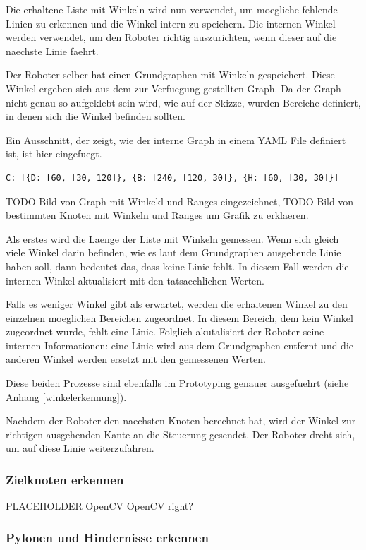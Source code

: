 Die erhaltene Liste mit Winkeln wird nun verwendet, um moegliche fehlende Linien zu erkennen und die Winkel intern zu speichern. Die internen Winkel werden verwendet, um den Roboter richtig auszurichten, wenn dieser auf die naechste Linie faehrt.

Der Roboter selber hat einen Grundgraphen mit Winkeln gespeichert. Diese Winkel ergeben sich aus dem zur Verfuegung gestellten Graph.
Da der Graph nicht genau so aufgeklebt sein wird, wie auf der Skizze, wurden Bereiche definiert, in denen sich die Winkel befinden sollten.

Ein Ausschnitt, der zeigt, wie der interne Graph in einem YAML File definiert ist, ist hier eingefuegt.

\begin{verbatim}
C: [{D: [60, [30, 120]}, {B: [240, [120, 30]}, {H: [60, [30, 30]}]
\end{verbatim}

TODO Bild von Graph mit Winkekl und Ranges eingezeichnet, TODO Bild von bestimmten Knoten mit Winkeln und Ranges um Grafik zu erklaeren.

Als erstes wird die Laenge der Liste mit Winkeln gemessen. Wenn sich gleich viele Winkel darin befinden, wie es laut dem Grundgraphen ausgehende Linie haben soll, dann bedeutet das, dass keine Linie fehlt. In diesem Fall werden die internen Winkel aktualisiert mit den tatsaechlichen Werten. 

Falls es weniger Winkel gibt als erwartet, werden die erhaltenen Winkel zu den einzelnen moeglichen Bereichen zugeordnet. In diesem Bereich, dem kein Winkel zugeordnet wurde, fehlt eine Linie. Folglich akutalisiert der Roboter seine internen Informationen: eine Linie wird aus dem Grundgraphen entfernt und die anderen Winkel werden ersetzt mit den gemessenen Werten.

Diese beiden Prozesse sind ebenfalls im Prototyping genauer ausgefuehrt (siehe Anhang \ref{winkelerkennung}).

Nachdem der Roboter den naechsten Knoten berechnet hat, wird der Winkel zur richtigen ausgehenden Kante an die Steuerung gesendet. Der Roboter dreht sich, um auf diese Linie weiterzufahren.

\subsubsection{Zielknoten erkennen}

PLACEHOLDER OpenCV OpenCV right?


\subsubsection{Pylonen und Hindernisse erkennen}



